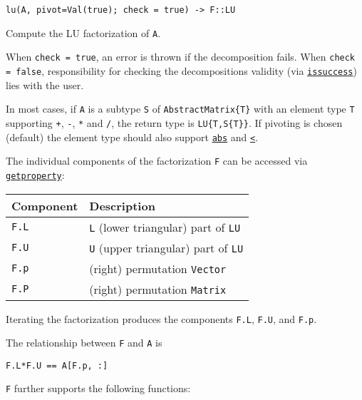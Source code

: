 \begin{adjustwidth}{2em}{0pt}


\begin{verbatim}
lu(A, pivot=Val(true); check = true) -> F::LU
\end{verbatim}

Compute the LU factorization of \texttt{A}.

When \texttt{check = true}, an error is thrown if the decomposition fails. When \texttt{check = false}, responsibility for checking the decomposition{\textquotesingle}s validity (via \hyperlink{10694198281534172656}{\texttt{issuccess}}) lies with the user.

In most cases, if \texttt{A} is a subtype \texttt{S} of \texttt{AbstractMatrix\{T\}} with an element type \texttt{T} supporting \texttt{+}, \texttt{-}, \texttt{*} and \texttt{/}, the return type is \texttt{LU\{T,S\{T\}\}}. If pivoting is chosen (default) the element type should also support \hyperlink{9614495866226399167}{\texttt{abs}} and \hyperlink{702782232449268329}{\texttt{<}}.

The individual components of the factorization \texttt{F} can be accessed via \hyperlink{11040282462516403506}{\texttt{getproperty}}:


\begin{table}[h]

\begin{tabulary}{\linewidth}{|L|L|}
\hline
Component & Description \\
\hline
\texttt{F.L} & \texttt{L} (lower triangular) part of \texttt{LU} \\
\hline
\texttt{F.U} & \texttt{U} (upper triangular) part of \texttt{LU} \\
\hline
\texttt{F.p} & (right) permutation \texttt{Vector} \\
\hline
\texttt{F.P} & (right) permutation \texttt{Matrix} \\
\hline
\end{tabulary}

\end{table}

Iterating the factorization produces the components \texttt{F.L}, \texttt{F.U}, and \texttt{F.p}.

The relationship between \texttt{F} and \texttt{A} is

\texttt{F.L*F.U == A[F.p, :]}

\texttt{F} further supports the following functions:


\begin{table}[h]


\end{table}
\end{adjustwidth}
